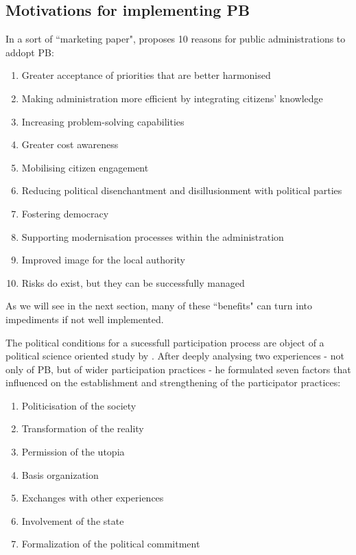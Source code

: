 \subsection{Motivations for implementing PB}

In a sort of ``marketing paper", \cite{Nitschke2013} proposes 10 reasons for public administrations to addopt PB:

\begin{enumerate}
\item Greater acceptance of priorities that are better harmonised
\item Making administration more efficient by integrating citizens’ knowledge
\item Increasing problem-solving capabilities
\item Greater cost awareness
\item Mobilising citizen engagement
\item Reducing political disenchantment and disillusionment with political parties
\item Fostering democracy
\item Supporting modernisation processes within the administration
\item Improved image for the local authority
\item Risks do exist, but they can be successfully managed
\end{enumerate}

As we will see in the next section, many of these ``benefits" can turn into impediments if not well implemented.

The political conditions for a sucessfull participation process are object of a political science oriented study by \cite{Addor2012}. After deeply analysing two experiences - not only of PB, but of wider participation practices - he formulated seven factors that influenced on the establishment and strengthening of the participator practices:

\begin{enumerate}
\item Politicisation of the society
\item Transformation of the reality
\item Permission of the utopia
\item Basis organization
\item Exchanges with other experiences
\item Involvement of the state
\item Formalization of the political commitment
\end{enumerate}


